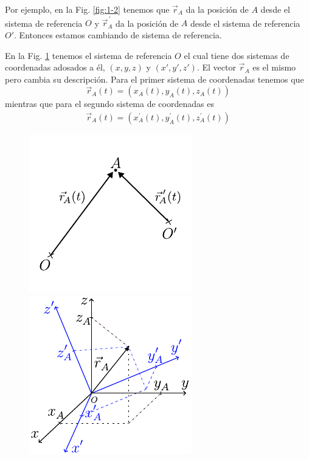 \begin{example}
  Por ejemplo, en la Fig. \ref{fig:1-2} tenemos que $\vec{r}_{\! A}$ da la posición de $A$ desde el sistema de 
  referencia $O$ y $\vec{r}^{\,\prime}_{\!A}$ da la posición de $A$ desde el sistema de referencia $O'$. Entonces 
  estamos cambiando de sistema de referencia.

  \para
  En la Fig. \ref{fig:1-3} tenemos el sistema de referencia $O$ el cual tiene dos sistemas de coordenadas adosados a 
  él, $(x,y,z)$ y $(x',y',z')$. El vector $\vec{r}_{\! A}$ es el mismo pero cambia su descripción. Para el primer 
  sistema de coordenadas tenemos que  
  \begin{equation*}
    \vec{r}_{A}(t) = (x_{A}(t),y_{A}(t),z_{A}(t)) 
  \end{equation*}
  mientras que para el segundo sistema de coordenadas es 
  \begin{align*}
    \vec{r}_{A}(t) = (x^{\prime}_{A}(t),y^{\prime}_{A}(t),z^{\prime}_{A}(t))
  \end{align*}
    \begin{figure}[htbp]
      \centering
      \begin{minipage}[b]{0.4\textwidth}
        \includegraphics[]{images/f1-2.pdf}
        \caption{}
        \label{fig:1-2}
      \end{minipage}
      \hspace{-0.02\textwidth}
      \begin{minipage}[b]{0.4\textwidth}
        \hspace{15pt}
        \includegraphics[]{images/f1-3.pdf}
        \caption{}
        \label{fig:1-3}
      \end{minipage}
    \end{figure}
\end{example}

